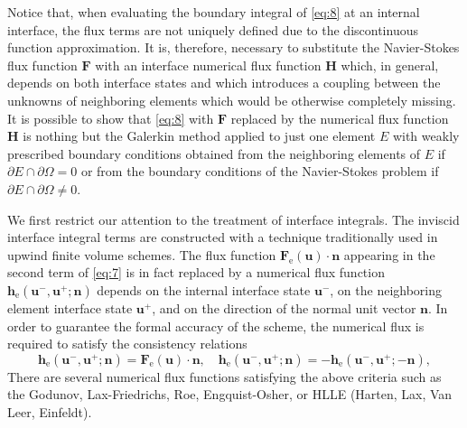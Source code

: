 \documentclass{develop-note}
\begin{document}
Notice that, when evaluating the boundary integral of \autoref{eq:8} at an internal interface, the flux terms are not uniquely defined due to the discontinuous function approximation. It is, therefore, necessary to substitute the Navier-Stokes flux function $\mathbf{F}$ with an interface numerical flux function $\mathbf{H}$ which, in general, depends on both interface states and which introduces a coupling between the unknowns of neighboring elements which would be otherwise completely missing. It is possible to show that \autoref{eq:8} with $\mathbf{F}$ replaced by the numerical flux function $\mathbf{H}$ is nothing but the Galerkin method applied to just one element $E$ with weakly prescribed boundary conditions obtained from the neighboring elements of $E$ if $\partial E\cap\partial\Omega =0$ or from the boundary conditions of the Navier-Stokes problem if $\partial E\cap\partial\Omega\neq 0$.

We first restrict our attention to the treatment of interface integrals. The inviscid interface integral terms are constructed with a technique traditionally used in upwind finite volume schemes. The flux function $\mathbf{F}_{\mathrm{e}}(\mathbf{u})\cdot\mathbf{n}$ appearing in the second term of \autoref{eq:7} is in fact replaced by a numerical flux function $\mathbf{h}_{\mathrm{e}}(\mathbf{u}^{-},\mathbf{u}^{+};\mathbf{n})$ depends on the internal interface state $\mathbf{u}^{-}$, on the neighboring element interface state $\mathbf{u}^{+}$, and on the direction of the normal unit vector $\mathbf{n}$. In order to guarantee the formal accuracy of the scheme, the numerical flux is required to satisfy the consistency relations
\begin{equation}
  \label{eq:9}
  \mathbf{h}_{\mathrm{e}}(\mathbf{u}^{-},\mathbf{u}^{+};\mathbf{n})=\mathbf{F}_{\mathrm{e}}(\mathbf{u})\cdot\mathbf{n},\quad\mathbf{h}_{\mathrm{e}}(\mathbf{u}^{-},\mathbf{u}^{+};\mathbf{n})=-\mathbf{h}_{\mathrm{e}}(\mathbf{u}^{-},\mathbf{u}^{+};-\mathbf{n}),
\end{equation}
There are several numerical flux functions satisfying the above criteria such as the Godunov, Lax-Friedrichs, Roe, Engquist-Osher, or HLLE (Harten, Lax, Van Leer, Einfeldt).
\end{document}
